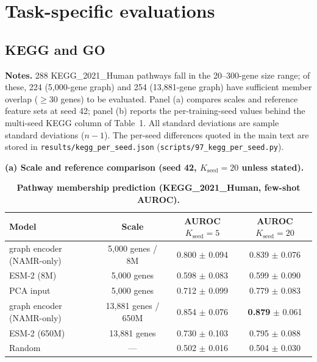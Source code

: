 \documentclass[11pt,a4paper]{article}
\begin{document}
\FloatBarrier


\section{Task-specific evaluations}

\subsection{KEGG and GO}

\begin{table}[H]
\centering
\caption{\textbf{Pathway membership prediction (KEGG\_2021\_Human, few-shot AUROC).}}

\smallskip
{\footnotesize \noindent \textbf{Notes.} 288 KEGG\_2021\_Human pathways fall in the 20--300-gene size range; of these, 224 (5,000-gene graph) and 254 (13,881-gene graph) have sufficient member overlap ($\geq 30$ genes) to be evaluated. Panel (a) compares scales and reference feature sets at seed 42; panel (b) reports the per-training-seed values behind the multi-seed KEGG column of Table~1. All standard deviations are sample standard deviations ($n-1$). The per-seed differences quoted in the main text are stored in \texttt{results/kegg\_\allowbreak per\_\allowbreak seed.\allowbreak json} (\texttt{scripts/97\_\allowbreak kegg\_\allowbreak per\_\allowbreak seed.\allowbreak py}).}

\label{tab:s11}
\footnotesize
\textbf{(a) Scale and reference comparison (seed 42, $K_{\text{seed}}=20$ unless stated).}
\begin{tabular}{@{}lccc@{}}
\toprule
\textbf{Model} & \textbf{Scale} & \textbf{AUROC $K_{\text{seed}}=5$} & \textbf{AUROC $K_{\text{seed}}=20$} \\
\midrule
graph encoder (NAMR-only) & 5,000 genes / 8M & 0.800 $\pm$ 0.094 & 0.839 $\pm$ 0.076 \\
ESM-2 (8M) & 5,000 genes & 0.598 $\pm$ 0.083 & 0.599 $\pm$ 0.090 \\
PCA input & 5,000 genes & 0.712 $\pm$ 0.099 & 0.779 $\pm$ 0.083 \\
graph encoder (NAMR-only) & 13,881 genes / 650M & 0.854 $\pm$ 0.076 & \textbf{0.879} $\pm$ 0.061 \\
ESM-2 (650M) & 13,881 genes & 0.730 $\pm$ 0.103 & 0.795 $\pm$ 0.088 \\
Random & --- & 0.502 $\pm$ 0.016 & 0.504 $\pm$ 0.030 \\
\bottomrule
\end{tabular}


\end{table}
\end{document}
